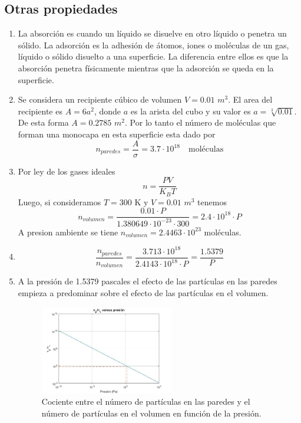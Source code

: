 \subsection{Otras propiedades}
\begin{enumerate}[resume]
    \item %
    La absorción es cuando un líquido se disuelve en otro líquido o penetra un sólido. La adsorción es la adhesión de átomos, iones o moléculas de un gas, líquido o sólido disuelto a una superficie. La diferencia entre ellos es que la absorción penetra físicamente mientras que la adsorción se queda en la superficie.  
    \item %
    Se considera un recipiente cúbico de volumen $V=0.01$ $m^3$. El area del recipiente es $A=6a^2$, donde $a$ es la arista del cubo y su valor es $a=\sqrt[3]{0.01}$. De esta forma $A=0.2785$ $m^2$. Por lo tanto el número de moléculas que forman una monocapa en esta superficie esta dado por
    \begin{equation}
        n_{paredes} = \frac{A}{\sigma} = 3.7 \cdot 10^{18} \quad \text{moléculas}
    \end{equation}
    \item %
    Por ley de los gases ideales
    \begin{equation}
        n=\frac{PV}{K_{B}T}
    \end{equation}
    Luego, si consideramos $T=300$ K y $V=0.01$ $m^3$ tenemos
    \begin{equation}
        n_{volumen}=\frac{0.01\cdot P}{1.380649 \cdot 10^{-23}\cdot 300} = 2.4 \cdot 10^{18} \cdot P
    \end{equation}
    A presion ambiente se tiene $n_{volumen} = 2.4463 \cdot 10^{23}$ moléculas.
    \item %
    \begin{equation}
        \frac{n_{paredes}}{n_{volumen}}= \frac{3.713 \cdot 10^{18}}{2.4143 \cdot 10^{18} \cdot P}=\frac{1.5379} {P}
    \end{equation}
    \item %
    A la presión de 1.5379 pascales el efecto de las partículas en las paredes empieza a predominar sobre el efecto de las partículas en el volumen. 
    \begin{figure}
        \centering
        \includegraphics[width=0.55\textwidth]{Imagenes/Unidad/U2/grafp15.jpg}
        \caption{Cociente entre el número de partículas en las paredes y el número de partículas en el volumen en función de la presión.}
        \label{fig:my_label}
    \end{figure}
    
\end{enumerate}


